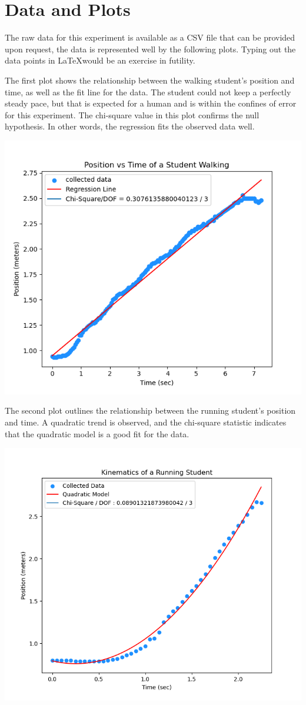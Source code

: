 \documentclass[hidelinks, 12pt, letterpaper]{article}
\begin{document}
\section{Data and Plots}
The raw data for this experiment is available as a CSV file that can be provided
upon request, the data is represented well by the following plots.
Typing out the data points in \LaTeX would be an exercise in futility.

The first plot shows the relationship between the walking student's position
and time, as well as the fit line for the data.
The student could not keep a perfectly steady pace, but that is expected 
for a human and is within the confines of error for this experiment.
The chi-square value in this plot confirms the null hypothesis. 
In other words, the regression fits the observed data well.

\includegraphics[width=0.9\linewidth]{walking-plot.png}

The second plot outlines the relationship between the running student's
position and time. 
A quadratic trend is observed, and the chi-square statistic indicates that
the quadratic model is a good fit for the data.

\includegraphics[width=0.9\linewidth]{run_plot.png}
\end{document}
